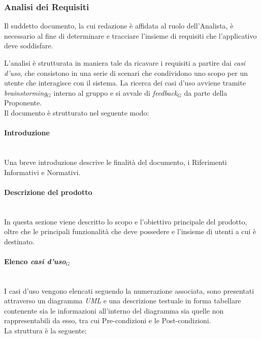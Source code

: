 \documentclass[10pt, letterpaper]{article}
\newcommand{\trisubsection}[1]{\paragraph{#1}\mbox{}\\}
\begin{document}
\subsubsection{Analisi dei Requisiti}
Il suddetto documento, la cui redazione è affidata al ruolo dell'Analista, è necessario al fine di determinare e tracciare l'insieme di
requisiti che l'applicativo deve soddisfare.

L'analisi è strutturata in maniera tale da ricavare i requisiti a partire dai \textit{casi d'uso}, che
consistono in una serie di scenari che condividono uno scopo per un utente che interagisce con il sistema. La ricerca dei casi d'uso avviene tramite \textit{brainstorming$_{G}$} interno al gruppo e si
avvale di \textit{feedback$_{G}$} da parte della Proponente.\\
Il documento è strutturato nel seguente modo:

\trisubsection{Introduzione}
Una breve introduzione descrive le finalità del documento, i Riferimenti Informativi e Normativi.

\trisubsection{Descrizione del prodotto}
In questa sezione viene descritto lo scopo e l'obiettivo principale del prodotto, oltre che  le principali funzionalità
che deve possedere e l'insieme di utenti a cui è destinato.

\trisubsection{Elenco \textit{casi d'uso$_{G}$}}
I {casi d'uso} vengono elencati seguendo la numerazione associata, sono presentati attraverso un diagramma \textit{UML} e una descrizione testuale in forma tabellare contenente sia le informazioni
all'interno del diagramma sia quelle non rappresentabili da esso, tra cui Pre-condizioni e le Post-condizioni.\\
La struttura è la seguente:
\end{document}
